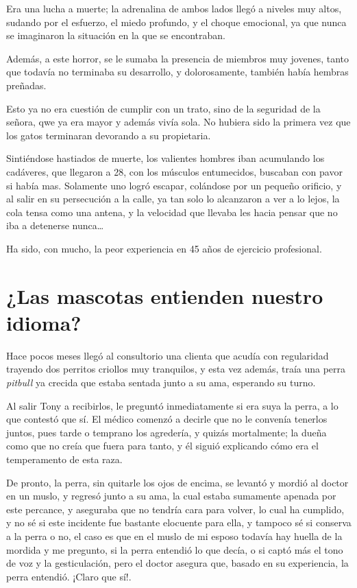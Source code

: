 \documentclass[letterpaper, 12pt]{book}
\begin{document}
Era una lucha a muerte; la adrenalina de ambos lados llegó a niveles muy altos, sudando por el esfuerzo, el miedo profundo, y el choque emocional, ya que nunca se imaginaron la situación en la que se encontraban.

Además, a este horror, se le sumaba la presencia de miembros muy jovenes, tanto que todavía no terminaba su desarrollo, y dolorosamente, también había hembras preñadas.

Esto ya no era cuestión de cumplir con un trato, sino de la seguridad de la señora, qwe ya era mayor y además vivía sola. No hubiera sido la primera vez que los gatos terminaran devorando a su propietaria.

Sintiéndose hastiados de muerte, los valientes hombres iban acumulando los cadáveres, que llegaron a 28, con los músculos entumecidos, buscaban con pavor si había mas. Solamente uno logró escapar, colándose por un pequeño orificio, y al salir en su persecución a la calle, ya tan solo lo alcanzaron a ver a lo lejos, la cola tensa como una antena, y la velocidad que llevaba les hacia pensar que no iba a detenerse nunca\ldots

Ha sido, con mucho, la peor experiencia en 45 años de ejercicio profesional.

\chapter{¿Las mascotas entienden nuestro idioma?}
Hace pocos meses llegó al consultorio una clienta que acudía con regularidad trayendo dos perritos criollos muy tranquilos, y esta vez además, traía una perra \textit{pitbull} ya crecida que estaba sentada junto a su ama, esperando su turno.

Al salir Tony a recibirlos, le preguntó inmediatamente si era suya la perra, a lo que contestó que sí. El médico comenzó a decirle que no le convenía tenerlos juntos, pues tarde o temprano los agredería, y quizás mortalmente; la dueña como que no creía que fuera para tanto, y él siguió explicando cómo era el temperamento de esta raza.

De pronto, la perra, sin quitarle los ojos de encima, se levantó y mordió al doctor en un muslo, y regresó junto a su ama, la cual estaba sumamente apenada por este percance, y aseguraba que no tendría cara para volver, lo cual ha cumplido, y no sé si este incidente fue bastante elocuente para ella, y tampoco sé si conserva a la perra o no, el caso es que en el muslo de mi esposo todavía hay huella de la mordida y me pregunto, si la perra entendió lo que decía, o si captó más el tono de voz y la gesticulación, pero el doctor asegura que, basado en su experiencia, la perra entendió. ¡Claro que sí!.
\end{document}
